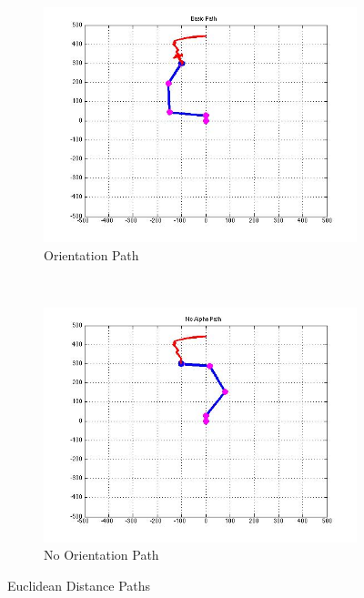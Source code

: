 \documentclass{article}
\begin{document}
\begin{figure}[htb]
\centering
\begin{subfigure}[b]{0.5\textwidth}
\centering
\includegraphics[scale=.5]{PathPics/Basic_Path.jpg}
\caption{Orientation Path}
\end{subfigure}%
~ 
\begin{subfigure}[b]{0.5\textwidth}
\centering
\includegraphics[scale=.5]{PathPics/NoAlpha_Path.jpg}
\caption{No Orientation Path}
\end{subfigure}

\caption{Euclidean Distance Paths}
\label{fig:basicPaths}
\end{figure}\\ 
\end{document}
